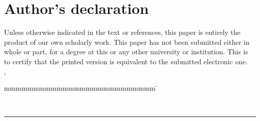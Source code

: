 \thispagestyle{empty}

\section*{Author's declaration}

\vspace*{2em}
Unless otherwise indicated in the text or references, this paper is entirely the product of our own scholarly work. This paper has not been submitted either in whole or part, for a degree at this or any other university or institution. This is to certify that the printed version is equivalent to the submitted electronic one.
\vspace*{3em}\\
\abgabeort, \datumAbgabe\\
\begin{tabbing}
	mmmmmmmmmmmmmmmmmmmmmmmmmm     \= \kill


	\vspace*{4em}\\
	\rule{6cm}{0.4pt}
	\autor	



\end{tabbing}